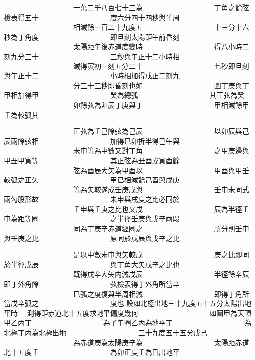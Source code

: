 \begin{正文}
　　　　　　　　　　一萬二千八百七十三為
　　　　　　　　　　丁角之餘弦檢表得五十
　　　　　　　　　　度六分四十四秒與半周
　　　　　　　　　　相減餘一百二十九度五
　　　　　　　　　　十三分十六秒為丁角度
　　　　　　　　　　即旦刻太陽距午前昏刻
　　　　　　　　　　太陽距午後赤道度變時
　　　　　　　　　　得八小時二刻九分三十
　　　　　　　　　　三秒與午正十二小時相
　　　　　　　　　　減得寅初一刻五分二十
　　　　　　　　　　七秒即旦刻與午正十二
　　　　　　　　　　小時相加得戌正二刻九
　　　　　　　　　　分三十三秒即昏刻也如
　　　　　　　　　　圖丁庚與丁甲相加得甲
　　　　　　　　　　癸為總弧
　　　　　　　　　　其正弦為癸
　　　　　　　　　　卯餘弦為卯辰丁庚與丁
　　　　　　　　　　甲相減餘甲壬為較弧其
\par
\end{正文}\clearpage
{}
\begin{正文}
　　　　　　　　　　正弦為壬己餘弦為己辰
　　　　　　　　　　以卯辰與己辰兩餘弦相
　　　　　　　　　　加得巳卯折半得己午與
　　　　　　　　　　未申等為中數又對丁角
　　　　　　　　　　之甲庚邊與甲丑甲寅等
　　　　　　　　　　其正弦為丑酉或寅酉餘
　　　　　　　　　　弦為酉辰大矢為甲酉以
　　　　　　　　　　甲酉與甲壬較弧之正矢
　　　　　　　　　　甲已相減餘己酉與戌庚
　　　　　　　　　　等為矢較遂成壬庚戌與
　　　　　　　　　　壬申未同式兩勾股形故
　　　　　　　　　　未申與戌庚之比必同於
　　　　　　　　　　壬申與壬庚之比也又戊
　　　　　　　　　　辰為半徑壬申為距等圈
　　　　　　　　　　之半徑壬庚與戊辛兩叚
　　　　　　　　　　同為丁庚辛赤道經圏之
　　　　　　　　　　所分則壬申與壬庚之比
　　　　　　　　　　原同於戊辰與戊辛之比
\par
\end{正文}\clearpage
{}
\begin{正文}
　　　　　　　　　　是以中數未申與矢較戌
　　　　　　　　　　庚之比即同於半徑戊辰
　　　　　　　　　　與丁角大矢戊辛之比也
　　　　　　　　　　既得戊辛大矢内減戊辰
　　　　　　　　　　半徑餘辛辰即丁外角餘
　　　　　　　　　　弦檢表得丁外角所當辛
　　　　　　　　　　巳弧之度復與半周相減
　　　　　　　　　　即得丁角所當戊辛弧之
　　　　　　　　　　度也
設如北極出地三十九度五十五分太陽出地平時
　測得距赤道北十五度求地平偏度幾何
　　　　　　　　　　如圖甲為天頂甲乙丙丁
　　　　　　　　　　為子午圈乙丙為地平丁
　　　　　　　　　　為北極丁丙為北極出地
　　　　　　　　　　三十九度五十五分戊己
　　　　　　　　　　為赤道庚為太陽庚辛為
　　　　　　　　　　太陽距赤道北十五度壬
　　　　　　　　　　為卯正庚壬為日出地平
\par
\end{正文}\clearpage
